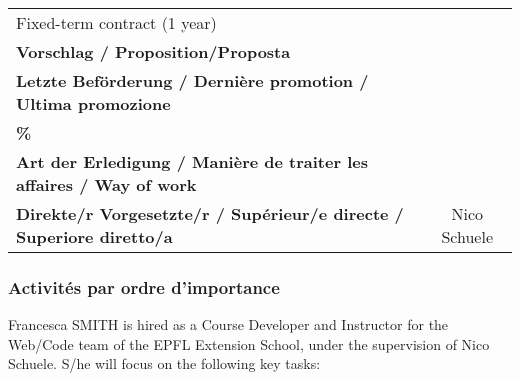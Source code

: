 \documentclass[
]{article}
\begin{document}
\begin{longtable}[]{@{}lc@{}}
\begin{minipage}[t]{0.50\columnwidth}
Fixed-term contract (1 year)\strut
\end{minipage}\tabularnewline
\begin{minipage}[t]{0.44\columnwidth}\raggedright
\textbf{Vorschlag / Proposition/Proposta}\strut
\end{minipage} & \begin{minipage}[t]{0.50\columnwidth}\centering
\strut
\end{minipage}\tabularnewline
\begin{minipage}[t]{0.44\columnwidth}\raggedright
\textbf{Letzte Beförderung / Dernière promotion / Ultima
promozione}\strut
\end{minipage} & \begin{minipage}[t]{0.50\columnwidth}\centering
\strut
\end{minipage}\tabularnewline
\begin{minipage}[t]{0.44\columnwidth}\raggedright
\textbf{\%}\strut
\end{minipage} & \begin{minipage}[t]{0.50\columnwidth}\centering
\strut
\end{minipage}\tabularnewline
\begin{minipage}[t]{0.44\columnwidth}\raggedright
\textbf{Art der Erledigung / Manière de traiter les affaires / Way of
work}\strut
\end{minipage} & \begin{minipage}[t]{0.50\columnwidth}\centering
\strut
\end{minipage}\tabularnewline
\begin{minipage}[t]{0.44\columnwidth}\raggedright
\textbf{Direkte/r Vorgesetzte/r / Supérieur/e directe / Superiore
diretto/a}\strut
\end{minipage} & \begin{minipage}[t]{0.50\columnwidth}\centering
Nico Schuele\strut
\end{minipage}\tabularnewline
\bottomrule
\end{longtable}

\hypertarget{activituxe9s-par-ordre-dimportance}{%
\subsubsection{Activités par ordre
d'importance}\label{activituxe9s-par-ordre-dimportance}}

Francesca SMITH is hired as a Course Developer and Instructor for the
Web/Code team of the EPFL Extension School, under the supervision of
Nico Schuele. S/he will focus on the following key tasks:
\end{document}
